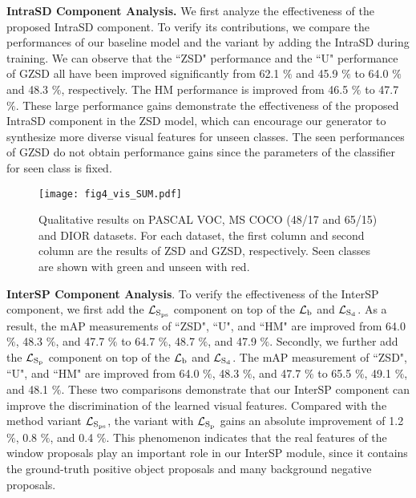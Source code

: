 \documentclass[10pt,twocolumn,letterpaper]{article}
\begin{document}
\textbf{IntraSD Component Analysis.} We first analyze the effectiveness of the proposed IntraSD component. To verify its contributions, we compare the performances of our baseline model and the variant by adding the IntraSD during training. We can observe that the ``ZSD" performance and the ``U" performance of GZSD all have been improved significantly from 62.1 $\%$ and 45.9 $\%$ to 64.0 $\%$ and 48.3 $\%$, respectively. The HM performance is improved from 46.5 $\%$ to 47.7 $\%$. These large performance gains demonstrate the effectiveness of the proposed IntraSD component in the ZSD model, which can encourage our generator to synthesize more diverse visual features for unseen classes. The seen performances of GZSD do not obtain performance gains since the parameters of the classifier for seen class is fixed.
\begin{figure*}[t]
  \centering
\texttt{[image: fig4\_vis\_SUM.pdf]}
   \caption{Qualitative results on PASCAL VOC, MS COCO (48/17 and 65/15) and DIOR datasets. For each dataset, the first column and second column are the results of ZSD and GZSD, respectively. Seen classes are shown with green and unseen with red.}
   \label{detection-results}
   \vspace{-4.2mm}
\end{figure*}


\textbf{InterSP Component Analysis}.  To verify the effectiveness of the InterSP component, we first add the $\mathcal{L}_{\rm S_{ps}}$ component on top of the $\mathcal{L}_{\rm b}$ and $\mathcal{L}_{\rm S_d}$. As a result, the mAP measurements of ``ZSD", ``U", and ``HM" are improved from 64.0 $\%$, 48.3 $\%$, and 47.7 $\%$ to 64.7 $\%$, 48.7 $\%$, and 47.9 $\%$. Secondly, we further add the $\mathcal{L}_{\rm S_p}$ component on top of the $\mathcal{L}_{\rm b}$ and $\mathcal{L}_{\rm S_d}$. The mAP measurement of ``ZSD", ``U", and ``HM" are improved from 64.0 $\%$, 48.3 $\%$, and 47.7 $\%$ to 65.5 $\%$, 49.1 $\%$, and 48.1 $\%$. These two comparisons demonstrate that our InterSP component can improve the discrimination of the learned visual features. Compared with the method variant $\mathcal{L}_{\rm S_{ps}}$, the variant with $\mathcal{L}_{\rm S_p}$ gains an absolute improvement of 1.2 $\%$, 0.8 $\%$, and 0.4 $\%$. This phenomenon indicates that the real features of the window proposals play an important role in our InterSP module, since it contains the ground-truth positive object proposals and many background negative proposals.
\end{document}
